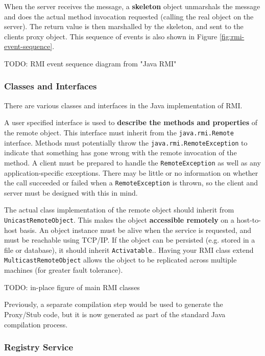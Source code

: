 \documentclass{article}
\begin{document}
When the server receives the message, a \textbf{skeleton} object unmarshals the message and does the actual method invocation requested (calling the real object on the server). The return value is then marshalled by the skeleton, and sent to the clients proxy object. This sequence of events is also shown in Figure \ref{fig:rmi-event-sequence}. 

TODO: RMI event sequence diagram from "Java RMI"

\subsubsection{Classes and Interfaces}

There are various classes and interfaces in the Java implementation of RMI. 

A user specified interface is used to \textbf{describe the methods and properties} of the remote object. This interface must inherit from the \texttt{java.rmi.Remote} interface. Methods must potentially throw the \texttt{java.rmi.RemoteException} to indicate that something has gone wrong with the remote invocation of the method. A client must be prepared to handle the \texttt{RemoteException} as well as any application-specific exceptions. There may be little or no information on whether the call succeeded or failed when a \texttt{RemoteException} is thrown, so the client and server must be designed with this in mind. 

The actual class implementation of the remote object should inherit from \texttt{UnicastRemoteObject}. This makes the object \textbf{accessible remotely} on a host-to-host basis. An object instance must be alive when the service is requested, and must be reachable using TCP/IP. If the object can be persisted (e.g. stored in a file or database), it should inherit \texttt{Activatable}.. Having your RMI class extend \texttt{MulticastRemoteObject} allows the object to be replicated across multiple machines (for greater fault tolerance).

TODO: in-place figure of main RMI classes

Previously, a separate compilation step would be used to generate the Proxy/Stub code, but it is now generated as part of the standard Java compilation process. 

\subsubsection{Registry Service}
\end{document}
